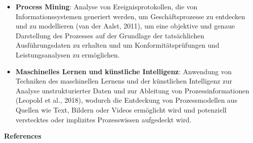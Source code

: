 \begin{itemize}
   \item \textbf{Process Mining}: Analyse von Ereignisprotokollen, die von Informationssystemen generiert werden, um Geschäftsprozesse zu entdecken und zu modellieren (van der Aalst, 2011), um eine objektive und genaue Darstellung des Prozesses auf der Grundlage der tatsächlichen Ausführungsdaten zu erhalten und um Konformitätsprüfungen und Leistungsanalysen zu ermöglichen.
   \item \textbf{Maschinelles Lernen und künstliche Intelligenz}: Anwendung von Techniken des maschinellen Lernens und der künstlichen Intelligenz zur Analyse unstrukturierter Daten und zur Ableitung von Prozessinformationen (Leopold et al., 2018), wodurch die Entdeckung von Prozessmodellen aus Quellen wie Text, Bildern oder Videos ermöglicht wird und potenziell verstecktes oder implizites Prozesswissen aufgedeckt wird.
\end{itemize}

\textbf{References}
